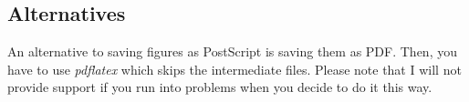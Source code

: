     \subsection{Alternatives}%
        An alternative to saving figures as PostScript is saving them as PDF. Then, you have to use \emph{pdflatex} which skips the intermediate files. Please note that I will not provide support if you run into problems when you decide to do it this way.
        
        
